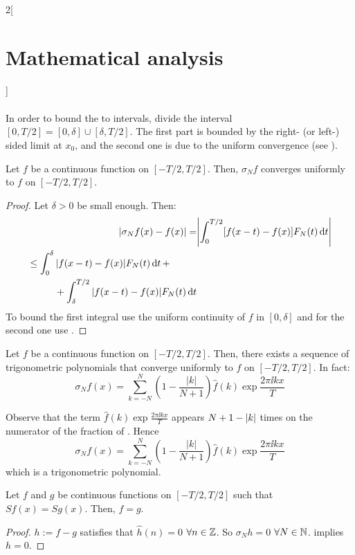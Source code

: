 \documentclass[../../../main_math.tex]{subfiles}
\begin{document}
\begin{multicols}{2}[\section{Mathematical analysis}]
\begin{sproof}
\begin{multline*}
    \end{multline*}
    In order to bound the to intervals, divide the interval $[0,T/2]=[0,\delta]\cup[\delta,T/2]$. The first part is bounded by the right- (or left-) sided limit at $x_0$, and the second one is due to the uniform convergence (see ).
  \end{sproof}
  \begin{theorem}\label{MA:fejerthm}
    Let $f$ be a continuous function on $[-T/2,T/2]$. Then, $\sigma_Nf$ converges uniformly to $f$ on $[-T/2,T/2]$.
  \end{theorem}
  \begin{proof}
    Let $\delta>0$ be small enough. Then:
    \begin{align*}
      \abs{\sigma_Nf(x)-f(x)}= & \abs{\int_0^{T/2}[f(x-t)-f(x)]F_N(t)\dd{t}} \\
      \begin{split}
        & \leq \int_0^{\delta}\abs{f(x-t)-f(x)}F_N(t)\dd{t}+\\
        &\hspace{1cm}+\int_\delta^{T/2}\abs{f(x-t)-f(x)}F_N(t)\dd{t}
      \end{split}
    \end{align*}
    To bound the first integral use the uniform continuity of $f$ in $[0,\delta]$ and for the second one use .
  \end{proof}
  \begin{corollary}
    Let $f$ be a continuous function on $[-T/2,T/2]$. Then, there exists a sequence of trigonometric polynomials that converge uniformly to $f$ on $[-T/2,T/2]$. In fact: $$\sigma_Nf(x)=\sum_{k=-N}^N\left(1-\frac{|k|}{N+1}\right)\widehat{f}(k)\exp{\frac{2\pi\ii kx}{T}}$$
  \end{corollary}
  \begin{sproof}
    Observe that the term $\widehat{f}(k)\exp{\frac{2\pi \ii k x}{T}}$ appears $N+1 - \abs{k}$ times on the numerator of the fraction of . Hence
    $$\sigma_Nf(x)=\sum_{k=-N}^N\left(1-\frac{|k|}{N+1}\right)\widehat{f}(k)\exp{\frac{2\pi\ii kx}{T}}$$
    which is a trigonometric polynomial.
  \end{sproof}
  \begin{corollary}
    Let $f$ and $g$ be continuous functions on $[-T/2,T/2]$ such that $Sf(x)=Sg(x)$. Then, $f=g$.
  \end{corollary}
  \begin{proof}
    $h:=f-g$ satisfies that $\widehat{h}(n)=0$ $\forall n\in\mathbb{Z}$. So $\sigma_Nh=0$ $\forall N\in\mathbb{N}$.  implies $h=0$.
  \end{proof}

\end{multicols}
\end{document}
